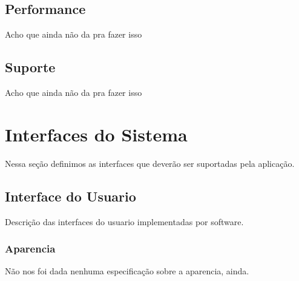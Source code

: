 \documentclass[11pt, a4paper]{article}
\begin{document}
		\subsection{Performance}
			Acho que ainda não da pra fazer isso
		
		\subsection{Suporte}
			Acho que ainda não da pra fazer isso
		
	\section{Interfaces do Sistema}
		Nessa seção definimos as interfaces que deverão ser suportadas pela 
		aplicação.
		
		\subsection{Interface do Usuario}
			Descrição das interfaces do usuario implementadas por software.
			
			\subsubsection{Aparencia}
				Não nos foi dada nenhuma especificação sobre a aparencia, ainda.
				
\end{document}
